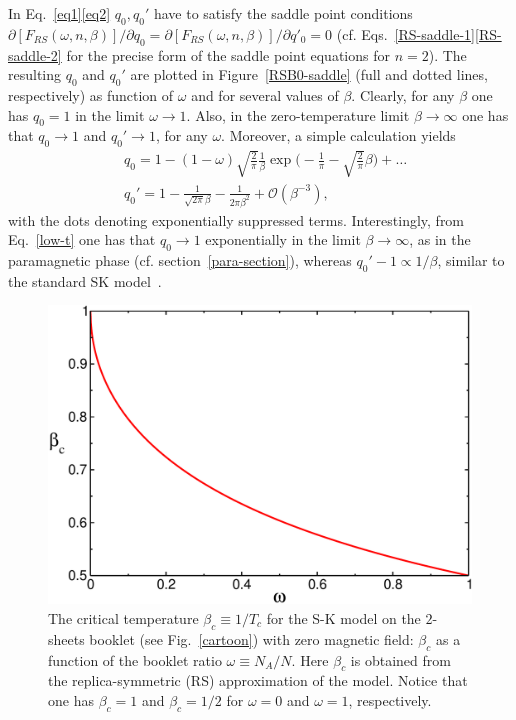 \documentclass[twocolumn,superscriptaddress,prb,10pt]{revtex4-1}
\begin{document}
In Eq.~\eqref{eq1}\eqref{eq2} 
$q_0,q_0'$ have to satisfy the saddle point conditions $\partial[F_{RS}(\omega,n,\beta)]/
\partial q_0=\partial[F_{RS}(\omega,n,\beta)]/\partial q'_0=0$ 
(cf. Eqs.~\eqref{RS-saddle-1}\eqref{RS-saddle-2} for the  precise form of the 
saddle point equations for $n=2$). 
The resulting $q_0$ and $q_0'$ are plotted in Figure~\ref{RSB0-saddle} (full 
and dotted lines, respectively) as function of $\omega$ and for several values of 
$\beta$. Clearly, for any $\beta$ one has $q_0=1$ in the limit $\omega\to 1$. Also, 
in the zero-temperature limit $\beta\to\infty$ one has that $q_0\to 1$ 
and $q_0'\to 1$, for any $\omega$. Moreover, a simple calculation yields  
%
\begin{align}
\label{low-t}
& q_0=1 -(1-\omega)\sqrt{\frac{2}{\pi}}\frac{1}{\beta}\exp\Big(-\frac{1}{\pi}-
\sqrt{\frac{2}{\pi}}\beta\Big)+\dots
\\\nonumber 
& q_0'=1-\frac{1}{\sqrt{2\pi}\beta}-\frac{1}{2\pi\beta^2}+{\mathcal O}(\beta^{-3}),
\end{align}
%
with the dots denoting exponentially suppressed terms. Interestingly, from 
Eq.~\eqref{low-t} one has that $q_0\to 1$ exponentially in the limit $\beta\to\infty$, 
as in the paramagnetic phase (cf. section~\ref{para-section}), whereas 
$q_0'-1\propto 1/\beta$, similar to the standard SK model~\cite{nishimori-book}. 


\begin{figure}[t]
\includegraphics*[width=0.9\linewidth]{./draft_figs/betac}
\caption{
 The critical temperature $\beta_c\equiv 1/T_c$ for the S-K model on the $2$-sheets  
 booklet (see Fig.~\ref{cartoon}) with zero magnetic field: $\beta_c$ as a function 
 of the booklet ratio $\omega\equiv N_A/N$. Here $\beta_c$  is obtained from the 
 replica-symmetric (RS) approximation of the model. Notice that one has $\beta_c=1$ 
 and $\beta_c=1/2$ for $\omega=0$ and $\omega=1$, respectively. 
}
\label{beta_c}
\end{figure}
\end{document}
